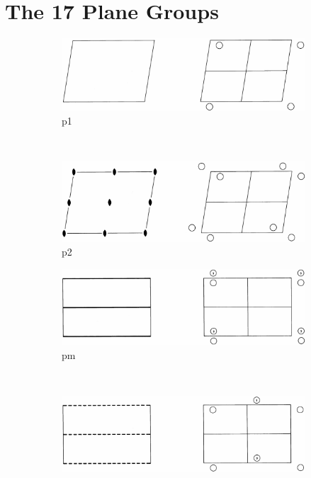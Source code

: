 \documentclass[12pt]{article}
\begin{document}
\section*{The 17 Plane Groups}

\begin{figure}[htp]
 \centering
    \begin{subfigure}[b]{0.45\textwidth}
        \centering
        \includegraphics[width=\textwidth]{planegroups/1.png}
        \caption*{p1}
    \end{subfigure}
    ~
    \begin{subfigure}[b]{0.45\textwidth}
        \centering
        \includegraphics[width=\textwidth]{planegroups/2.png}
        \caption*{p2}
    \end{subfigure}
    \begin{subfigure}[b]{0.45\textwidth}
        \centering
        \includegraphics[width=\textwidth]{planegroups/3.png}
        \caption*{pm}
    \end{subfigure}
	~    
    \begin{subfigure}[b]{0.45\textwidth}
        \centering
        \includegraphics[width=\textwidth]{planegroups/4.png}

\end{subfigure}
\end{figure}
\end{document}
